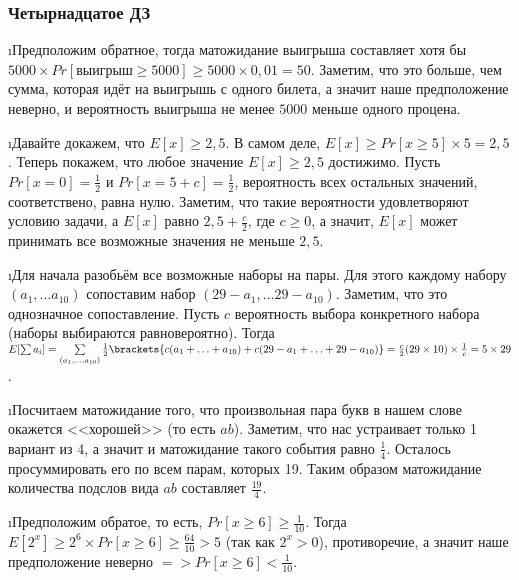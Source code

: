 \subsubsection{Четырнадцатое ДЗ}


\i Предположим обратное, тогда матожидание выигрыша составляет хотя бы $5000 \times Pr[\text{выигрыш} \geq 5000] \geq 5000 \times 0{,}01 = 50$. Заметим, что это больше, чем сумма, которая идёт на выигрышь с одного билета, а значит наше предположение неверно, и вероятность выигрыша не менее $5000$ меньше одного процена.

\i Давайте докажем, что $E[x] \geq 2{,}5$. В самом деле, $E[x] \geq Pr[x \geq 5] \times 5 = 2{,}5$. Теперь покажем, что любое значение $E[x] \geq 2{,}5$ достижимо. Пусть $Pr[x = 0] = \frac{1}{2}$ и $Pr[x = 5+c] = \frac{1}{2}$, вероятность всех остальных значений, соответствено, равна нулю. Заметим, что такие вероятности удовлетворяют условию задачи, а $E[x]$ равно $2{,}5 + \frac{c}{2}$, где $c \geq 0$, а значит, $E[x]$ может принимать все возможные значения не меньше $2{,}5$.

\i Для начала разобьём все возможные наборы на пары. Для этого каждому набору $(a_1, \ldots a_{10})$ сопоставим набор $(29-a_1, \ldots 29-a_{10})$. Заметим, что это однозначное сопоставление. Пусть $c$ вероятность выбора конкретного набора (наборы выбираются равновероятно). Тогда $E[\sum a_i] = \sum\limits_{(a_1, \ldots, a_{10})}\frac{1}{2}\brackets{c(a_1 + \ldots + a_{10}) + c(29-a_1 + \ldots + 29-a_{10})} = \frac{c}{2}(29\times 10)\times \frac{1}{c} = 5\times29$.

\i Посчитаем матожидание того, что произвольная пара букв в нашем слове окажется <<хорошей>> (то есть $ab$). Заметим, что нас устраивает только 1 вариант из 4, а значит и матожидание такого события равно $\frac{1}{4}$. Осталось просуммировать его по всем парам, которых 19. Таким образом матожидание количества подслов вида $ab$ составляет $\frac{19}{4}$.

\i Предположим обратое, то есть, $Pr[x \geq 6] \geq \frac{1}{10}$. Тогда $E[2^x] \geq 2^6 \times Pr[x \geq 6] \geq \frac{64}{10} > 5$ (так как $2^x > 0$), противоречие, а значит наше предположение неверно $=> Pr[x \geq 6] < \frac{1}{10}$. 

